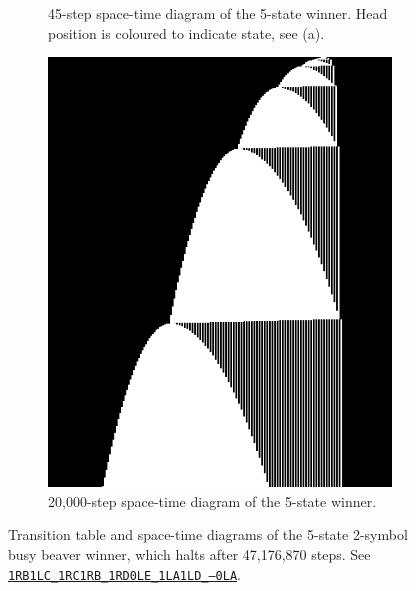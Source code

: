 \begin{figure}[ht]
\begin{subfigure}[b]{0.31\textwidth}
        \caption{45-step space-time diagram of the 5-state winner. Head position is coloured to indicate state, see (a).}
        \label{fig:bb5-diagram}
    \end{subfigure}
    \hfill
    \begin{subfigure}[b]{0.3\textwidth}
        \centering
        \includegraphics[width=1\linewidth]{figures/space-time-diagrams/bb5_20k.png}
        \caption{20,000-step space-time diagram of the 5-state winner.}\label{fig:bb5-diagram-zoomout}
    \end{subfigure}

    \caption{Transition table and space-time diagrams of the 5-state 2-symbol busy beaver winner, which halts after 47,176,870 steps. See
        \href{https://bbchallenge.org/1RB1LC_1RC1RB_1RD0LE_1LA1LD_---0LA}{\texttt{1RB1LC\_1RC1RB\_1RD0LE\_1LA1LD\_---0LA}}.}\label{fig:bb5win}
\end{figure}






